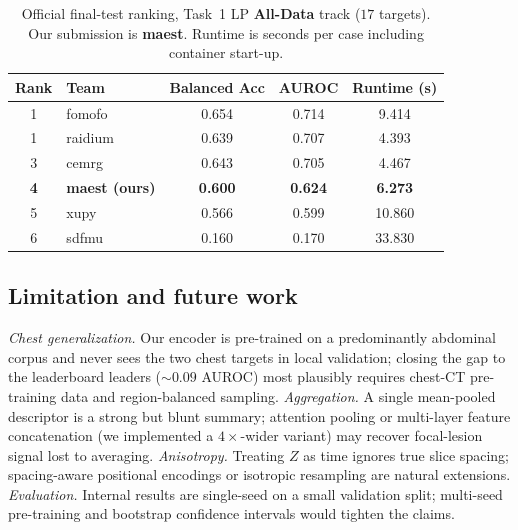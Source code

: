 \documentclass[runningheads]{llncs}
\begin{document}
\begin{table}[htbp]
\caption{Official final-test ranking, Task~1 LP \textbf{All-Data} track ($17$
targets). Our submission is \textbf{maest}. Runtime is seconds per case including
container start-up.}\label{tab:leaderboard}
\centering
\begin{tabular}{clccc}
\hline
Rank & Team & Balanced Acc & AUROC & Runtime (s) \\ \hline
1 & fomofo            & 0.654 & 0.714 & 9.414 \\
1 & raidium           & 0.639 & 0.707 & 4.393 \\
3 & cemrg             & 0.643 & 0.705 & 4.467 \\
\textbf{4} & \textbf{maest (ours)} & \textbf{0.600} & \textbf{0.624} & \textbf{6.273} \\
5 & xupy              & 0.566 & 0.599 & 10.860 \\
6 & sdfmu             & 0.160 & 0.170 & 33.830 \\ \hline
\end{tabular}
\end{table}

\subsection{Limitation and future work}
\label{sec:limitations}
\emph{Chest generalization.} Our encoder is pre-trained on a predominantly
abdominal corpus and never sees the two chest targets in local validation;
closing the gap to the leaderboard leaders ($\sim\!0.09$ AUROC) most plausibly
requires chest-CT pre-training data and region-balanced sampling.
\emph{Aggregation.} A single mean-pooled descriptor is a strong but blunt
summary; attention pooling or multi-layer feature concatenation (we implemented a
$4\times$-wider variant) may recover focal-lesion signal lost to averaging.
\emph{Anisotropy.} Treating $Z$ as time ignores true slice spacing; spacing-aware
positional encodings or isotropic resampling are natural extensions.
\emph{Evaluation.} Internal results are single-seed on a small validation split;
multi-seed pre-training and bootstrap confidence intervals would tighten the
claims.

\end{document}

